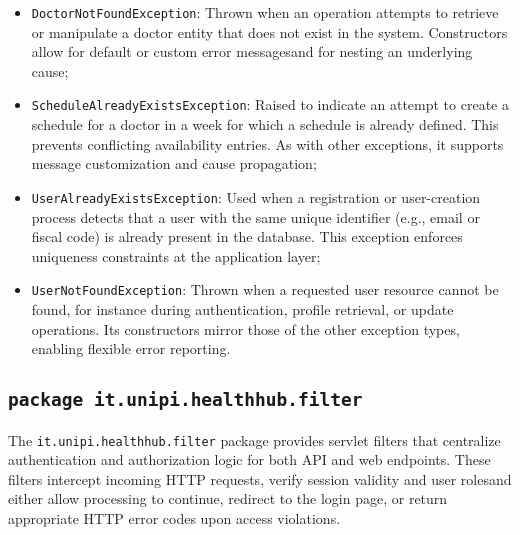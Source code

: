 \begin{itemize}
	\item \texttt{DoctorNotFoundException}:  
	Thrown when an operation attempts to retrieve or manipulate a doctor entity that does not exist in the system. Constructors allow for default or custom error messagesand for nesting an underlying cause;
	
	\item \texttt{ScheduleAlreadyExistsException}:  
	Raised to indicate an attempt to create a schedule for a doctor in a week for which a schedule is already defined. This prevents conflicting availability entries. As with other exceptions, it supports message customization and cause propagation;
	
	\item \texttt{UserAlreadyExistsException}:  
	Used when a registration or user-creation process detects that a user with the same unique identifier (e.g., email or fiscal code) is already present in the database. This exception enforces uniqueness constraints at the application layer;
	
	\item \texttt{UserNotFoundException}:  
	Thrown when a requested user resource cannot be found, for instance during authentication, profile retrieval, or update operations. Its constructors mirror those of the other exception types, enabling flexible error reporting.
\end{itemize}

\subsection{\texttt{package it.unipi.healthhub.filter}}
The \texttt{it.unipi.healthhub.filter} package provides servlet filters that centralize authentication and authorization logic for both API and web endpoints. These filters intercept incoming HTTP requests, verify session validity and user rolesand either allow processing to continue, redirect to the login page, or return appropriate HTTP error codes upon access violations.


